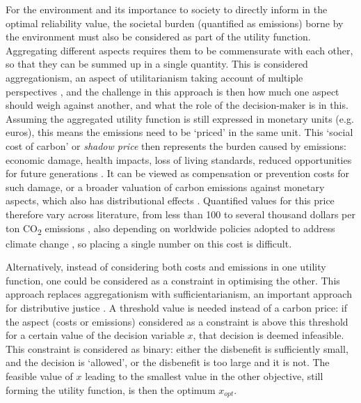 For the environment and its importance to society to directly inform in the optimal reliability value, the societal burden (quantified as emissions) borne by the environment must also be considered as part of the utility function.
Aggregating different aspects requires them to be commensurate with each other, so that they can be summed up in a single quantity.
This is considered aggregationism, an aspect of utilitarianism taking account of multiple perspectives \citep{Narveson2009WhenWhy}, and the challenge in this approach is then how much one aspect should weigh against another, and what the role of the decision-maker is in this.
Assuming the aggregated utility function is still expressed in monetary units (e.g. euros), this means the emissions need to be `priced' in the same unit.
This `social cost of carbon' or \emph{shadow price} then represents the burden caused by emissions: economic damage, health impacts, loss of living standards, reduced opportunities for future generations \citep{Boyce2018CarbonEquity}.
It can be viewed as compensation or prevention costs for such damage, or a broader valuation of carbon emissions against monetary aspects, which also has distributional effects \cite{Shei2024DistributionalApproaches}.
Quantified values for this price therefore vary across literature, from less than 100 to several thousand dollars per ton CO\textsubscript{2} emissions \citep{Lomborg2020WelfarePolicies, Wang2022GlobalCosts, KamaliSaraji2024BridgingApplications}, also depending on worldwide policies adopted to address climate change \citep{Yang2018SocialPathways, IntergovernmentalPanelonClimateChangeIPCC2023SummaryPolicymakers}, so placing a single number on this cost is difficult.

Alternatively, instead of considering both costs and emissions in one utility function, one could be considered as a constraint in optimising the other.
This approach replaces aggregationism with sufficientarianism, an important approach for distributive justice \citep{Alcantud2022Sufficientarianism}.
A threshold value is needed instead of a carbon price: if the aspect (costs or emissions) considered as a constraint is above this threshold for a certain value of the decision variable $x$, that decision is deemed infeasible.
This constraint is considered as binary: either the disbenefit is sufficiently small, and the decision is `allowed', or the disbenefit is too large and it is not.
The feasible value of $x$ leading to the smallest value in the other objective, still forming the utility function, is then the optimum $x_{opt}$.

